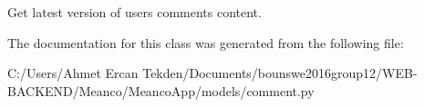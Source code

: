 Get latest version of users comments content. 



The documentation for this class was generated from the following file\+:\begin{DoxyCompactItemize}
\item 
C\+:/\+Users/\+Ahmet Ercan Tekden/\+Documents/bounswe2016group12/\+W\+E\+B-\/\+B\+A\+C\+K\+E\+N\+D/\+Meanco/\+Meanco\+App/models/comment.\+py\end{DoxyCompactItemize}
